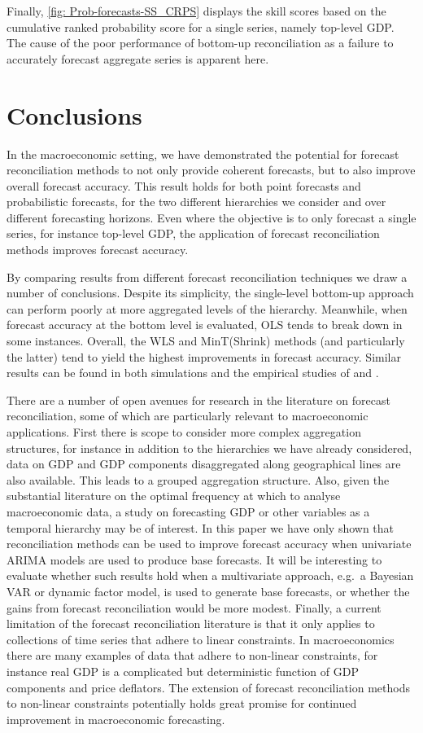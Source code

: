\documentclass[a4paper, 11pt]{article}
\begin{document}
Finally, \autoref{fig: Prob-forecasts-SS_CRPS} displays the skill scores based on the cumulative ranked probability score for a single series, namely top-level GDP\@. The cause of the poor performance of bottom-up reconciliation as a failure to accurately forecast aggregate series is apparent here.

\section{Conclusions}\label{sec:conclusions}

In the macroeconomic setting, we have demonstrated the potential for forecast reconciliation methods to not only provide coherent forecasts, but to also improve overall forecast accuracy. This result holds for both point forecasts and probabilistic forecasts, for the two different hierarchies we consider and over different forecasting horizons. Even where the objective is to only forecast a single series, for instance top-level GDP, the application of forecast reconciliation methods improves forecast accuracy.

By comparing results from different forecast reconciliation techniques we draw a number of conclusions. Despite its simplicity, the single-level bottom-up approach can perform poorly at more aggregated levels of the hierarchy. Meanwhile, when forecast accuracy at the bottom level is evaluated, OLS tends to break down in some instances. Overall, the WLS and MinT(Shrink) methods (and particularly the latter) tend to yield the highest improvements in forecast accuracy. Similar results can be found in both simulations and the empirical studies of \citet{AthEtAl2017} and \citet{WicEtAl2019}.

There are a number of open avenues for research in the literature on forecast reconciliation, some of which are particularly relevant to macroeconomic applications. First there is scope to consider more complex aggregation structures, for instance in addition to the hierarchies we have already considered, data on GDP and GDP components disaggregated along geographical lines are also available. This leads to a grouped aggregation structure. Also, given the substantial literature on the optimal frequency at which to analyse macroeconomic data, a study on forecasting GDP or other variables as a temporal hierarchy may be of interest. In this paper we have only shown that reconciliation methods can be used to improve forecast accuracy when univariate ARIMA models are used to produce base forecasts. It will be interesting to evaluate whether such results hold when a multivariate approach, e.g.\ a Bayesian VAR or dynamic factor model, is used to generate base forecasts, or whether the gains from forecast reconciliation would be more modest. Finally, a current limitation of the forecast reconciliation literature is that it only applies to collections of time series that adhere to linear constraints. In macroeconomics there are many examples of data that adhere to non-linear constraints, for instance real GDP is a complicated but deterministic function of GDP components and price deflators. The extension of forecast reconciliation methods to non-linear constraints potentially holds great promise for continued improvement in macroeconomic forecasting.
\end{document}
